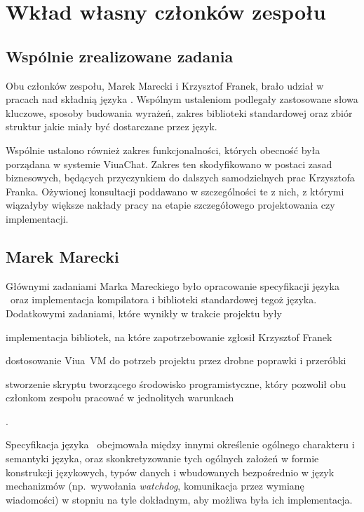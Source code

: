 \chapter{Wkład własny członków zespołu}
\label{wklad_wlasny}

\section{Wspólnie zrealizowane zadania}

Obu członków zespołu, Marek Marecki i Krzysztof Franek, brało udział w pracach
nad składnią języka \ViuAct. Wspólnym ustaleniom podlegały zastosowane słowa
kluczowe, sposoby budowania wyrażeń, zakres biblioteki standardowej oraz
zbiór struktur jakie miały być dostarczane przez język.

Wspólnie ustalono również zakres funkcjonalności, których obecność była porządana
w systemie ViuaChat. Zakres ten skodyfikowano w postaci zasad biznesowych, będących
przyczynkiem do dalszych samodzielnych prac Krzysztofa Franka. Ożywionej
konsultacji poddawano w szczególności te z nich, z którymi wiązałyby
większe nakłady pracy na etapie szczegółowego projektowania czy implementacji.

\section{Marek Marecki}

Głównymi zadaniami Marka Mareckiego było opracowanie specyfikacji języka
\ViuAct\ oraz implementacja kompilatora i biblioteki standardowej tegoż języka.
Dodatkowymi zadaniami, które wynikły w trakcie projektu były
\begin{enumerate*}[label=(\arabic*)]
\item implementacja bibliotek, na które zapotrzebowanie zgłosił Krzysztof Franek
\item dostosowanie Viua~VM do potrzeb projektu przez drobne poprawki i przeróbki
\item stworzenie skryptu tworzącego środowisko programistyczne, który pozwolił
    obu członkom zespołu pracować w jednolitych warunkach
\end{enumerate*}.

Specyfikacja języka \ViuAct\ obejmowała między innymi określenie ogólnego
charakteru i semantyki języka, oraz skonkretyzowanie tych ogólnych założeń w
formie konstrukcji językowych, typów danych i wbudowanych bezpośrednio w język
mechanizmów (np.~wywołania \emph{watchdog}, komunikacja przez wymianę
wiadomości) w stopniu na tyle dokładnym, aby możliwa była ich implementacja.


